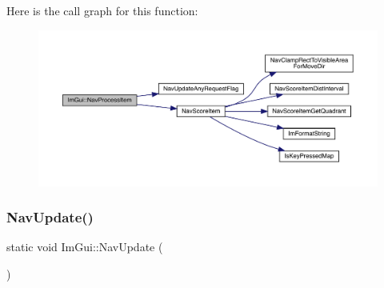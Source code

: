 Here is the call graph for this function\+:
\nopagebreak
\begin{figure}[H]
\begin{center}
\leavevmode
\includegraphics[width=350pt]{df/d13/namespace_im_gui_a294f4417f6a5aa0b6528a4d70f8922a7_cgraph}
\end{center}
\end{figure}
\mbox{\label{namespace_im_gui_aab7d3ffa460af6604421e8c2d8bdef19}} 
\subsubsection{\texorpdfstring{Nav\+Update()}{NavUpdate()}}
{\footnotesize\ttfamily static void Im\+Gui\+::\+Nav\+Update (\begin{DoxyParamCaption}{ }\end{DoxyParamCaption})\hspace{0.3cm}{\ttfamily [static]}}


